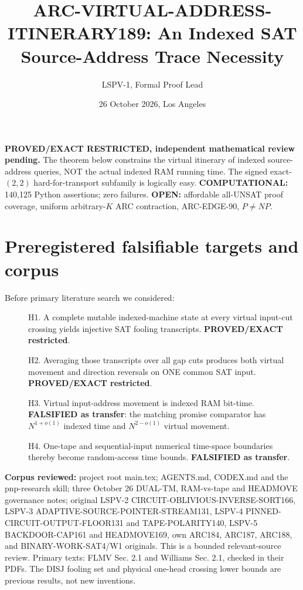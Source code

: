 \documentclass[11pt]{article}
\title{ARC-VIRTUAL-ADDRESS-ITINERARY189: An Indexed SAT Source-Address Trace Necessity}
\author{LSPV-1, Formal Proof Lead}
\date{26 October 2026, Los Angeles}
\begin{document}
\maketitle
\noindent\textbf{PROVED/EXACT RESTRICTED, independent mathematical review pending.}
The theorem below constrains the virtual itinerary of indexed source-address queries, NOT the actual indexed RAM running time. The signed exact-$(2,2)$ hard-for-transport subfamily is logically easy.
\textbf{COMPUTATIONAL:} 140,125 Python assertions; zero failures.
\textbf{OPEN:} affordable all-UNSAT proof coverage, uniform arbitrary-$K$ ARC contraction, ARC-EDGE-90, $P\ne NP$.

\section{Preregistered falsifiable targets and corpus}
Before primary literature search we considered:
\begin{description}
\item[] H1. A complete mutable indexed-machine state at every virtual input-cut crossing yields injective SAT fooling transcripts. \textbf{PROVED/EXACT restricted}.
\item[] H2. Averaging those transcripts over all gap cuts produces both virtual movement and direction reversals on ONE common SAT input. \textbf{PROVED/EXACT restricted}.
\item[] H3. Virtual input-address movement is indexed RAM bit-time. \textbf{FALSIFIED as transfer}: the matching promise comparator has $N^{1+o(1)}$ indexed time and $N^{2-o(1)}$ virtual movement.
\item[] H4. One-tape and sequential-input numerical time-space boundaries thereby become random-access time bounds. \textbf{FALSIFIED as transfer}.
\end{description}
\noindent\textbf{Corpus reviewed:} project root main.tex; AGENTS.md, CODEX.md and the pnp-research skill; three October 26 DUAL-TM, RAM-vs-tape and HEADMOVE governance notes; original LSPV-2 CIRCUIT-OBLIVIOUS-INVERSE-SORT166, LSPV-3 ADAPTIVE-SOURCE-POINTER-STREAM131, LSPV-4 PINNED-CIRCUIT-OUTPUT-FLOOR131 and TAPE-POLARITY140, LSPV-5 BACKDOOR-CAP161 and HEADMOVE169, own ARC184, ARC187, ARC188, and BINARY-WORK-SAT4/W1 originals. This is a bounded relevant-source review. Primary texts: FLMV Sec. 2.1 and Williams Sec. 2.1, checked in their PDFs. The DISJ fooling set and physical one-head crossing lower bounds are previous results, not new inventions.
\end{document}
